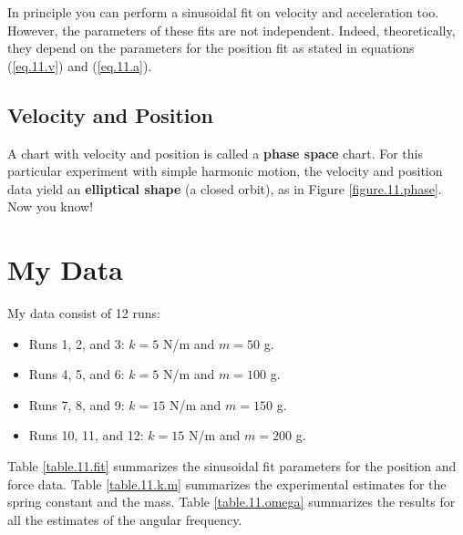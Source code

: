 In principle you can perform a sinusoidal fit on velocity and acceleration too. However, the parameters of these fits are not independent. Indeed, theoretically, they depend on the parameters for the position fit as stated in equations (\ref{eq.11.v}) and (\ref{eq.11.a}).
%
\subsection{Velocity and Position}
%
A chart with velocity and position is called a \textbf{phase space} chart. For this particular experiment with simple harmonic motion, the velocity and position data yield an \textbf{elliptical shape} (a closed orbit), as in Figure \ref{figure.11.phase}. Now you know!
%
\section{My Data}
%
My data consist of 12 runs:
\begin{itemize}
    \item Runs 1, 2, and 3: $k = 5$ N/m and $m = 50$ g.
    \item Runs 4, 5, and 6: $k = 5$ N/m and $m = 100$ g.
    \item Runs 7, 8, and 9: $k = 15$ N/m and $m = 150$ g.
    \item Runs 10, 11, and 12: $k = 15$ N/m and $m = 200$ g.
\end{itemize}
Table \ref{table.11.fit} summarizes the sinusoidal fit parameters for the position and force data. Table \ref{table.11.k.m} summarizes the experimental estimates for the spring constant and the mass. Table \ref{table.11.omega} summarizes the results for all the estimates of the angular frequency.
%
